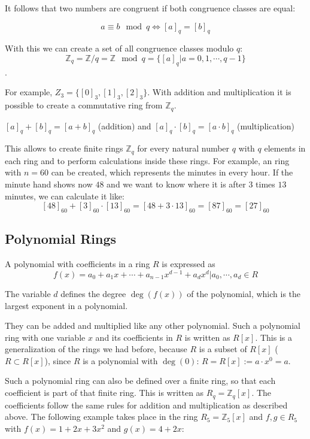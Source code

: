 It follows that two numbers are congruent if both congruence classes are equal:

$$a \equiv b \mod q \Leftrightarrow [a]_q = [b]_q$$

With this we can create a set of all congruence classes modulo $q$:
$$\mathbb{Z}_q = \mathbb{Z}/q = \mathbb{Z} \mod q = \{[a]_q | a = 0, 1, \cdots, q-1 \}$$.

For example, $Z_3 = \{[0]_3, [1]_3, [2]_3\}$. With addition and multiplication it is possible to create a commutative ring from $\mathbb{Z}_q$.
\begin{center}
  $[a]_q + [b]_q = [a+b]_q$ (addition) and $[a]_q \cdot [b]_q = [a\cdot b]_q$ (multiplication)
\end{center}

This allows to create finite rings $\mathbb{Z}_q$ for every natural number $q$ with $q$ elements in each ring and to perform calculations inside these rings. For example, an ring with $n=60$ can be created, which represents the minutes in every hour. If the minute hand shows now $48$ and we want to know where it is after $3$ times $13$ minutes, we can calculate it like:
$$[48]_{60} + [3]_{60}\cdot [13]_{60} = [48+3\cdot 13]_{60} = [87]_{60} = [27]_{60}$$

\subsection*{Polynomial Rings}

A polynomial with coefficients in a ring $R$ is expressed as 
$$f(x) = a_0+ a_1x+\cdots+ a_{n-1}x^{d-1}+a_dx^d | a_0, \cdots, a_d \in R$$

The variable $d$ defines the degree $\deg(f(x))$ of the polynomial, which is the largest exponent in a polynomial.

They can be added and multiplied like any other polynomial. Such a polynomial ring with one variable $x$ and its coefficients in $R$ is written as $R[x]$. This is a generalization of the rings we had before, because $R$ is a subset of $R[x]$ ($R \subset R[x]$), since $R$ is a polynomial with $\deg(0)$: $R = R[x] := a\cdot x^0 = a$.

Such a polynomial ring can also be defined over a finite ring, so that each coefficient is part of that finite ring. This is written as $R_q = \mathbb{Z}_q[x]$. The coefficients follow the same rules for addition and multiplication as described above. The following example takes place in the ring $R_5 = \mathbb{Z}_5[x]$ and $f, g \in R_5$ with $f(x)=1+2x+3x^2$ and $g(x)=4+2x$:

